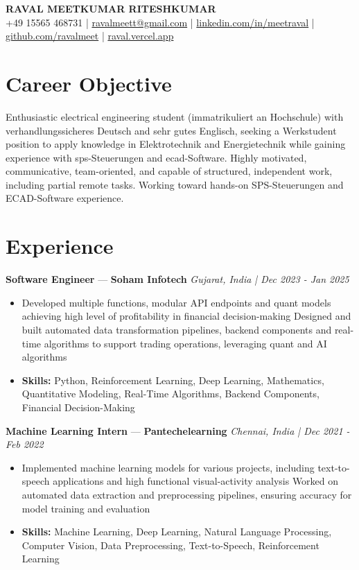 \documentclass[a4paper,10pt]{article}
\begin{document}
\begin{center}
  {\Large\bfseries RAVAL MEETKUMAR RITESHKUMAR}\\[2pt]
  {\small +49 15565 468731 \;|\; \href{mailto:ravalmeett@gmail.com}{ravalmeett@gmail.com} \;|\; \href{https://www.linkedin.com/in/meetraval/}{linkedin.com/in/meetraval} \;|\; \href{https://github.com/ravalmeet}{github.com/ravalmeet} \;|\; \href{https://raval.vercel.app/}{raval.vercel.app}}
\end{center}
\vspace{-3pt}

\section*{Career Objective}
Enthusiastic electrical engineering student (immatrikuliert an Hochschule) with verhandlungssicheres Deutsch and sehr gutes Englisch, seeking a Werkstudent position to apply knowledge in Elektrotechnik and Energietechnik while gaining experience with sps-Steuerungen and ecad-Software. Highly motivated, communicative, team-oriented, and capable of structured, independent work, including partial remote tasks. Working toward hands-on SPS-Steuerungen and ECAD-Software experience.\par

\section*{Experience}
\textbf{Software Engineer} — \textbf{Soham Infotech} \hfill \textit{Gujarat, India \;|\; Dec 2023 - Jan 2025}\par
\vspace{1pt}
\begin{itemize}
  \item Developed multiple functions, modular API endpoints and quant models achieving high level of profitability in financial decision-making Designed and built automated data transformation pipelines, backend components and real-time algorithms to support trading operations, leveraging quant and AI algorithms
  \item \textbf{Skills:} Python, Reinforcement Learning, Deep Learning, Mathematics, Quantitative Modeling, Real-Time Algorithms, Backend Components, Financial Decision-Making
\end{itemize}
\vspace{3pt}
\textbf{Machine Learning Intern} — \textbf{Pantechelearning} \hfill \textit{Chennai, India \;|\; Dec 2021 - Feb 2022}\par
\vspace{1pt}
\begin{itemize}
  \item Implemented machine learning models for various projects, including text-to-speech applications and high functional visual-activity analysis Worked on automated data extraction and preprocessing pipelines, ensuring accuracy for model training and evaluation
  \item \textbf{Skills:} Machine Learning, Deep Learning, Natural Language Processing, Computer Vision, Data Preprocessing, Text-to-Speech, Reinforcement Learning
\end{itemize}
\end{document}

